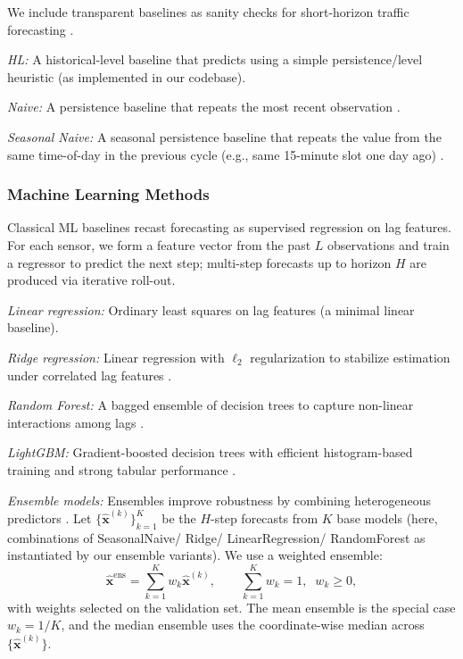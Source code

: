\documentclass[10pt]{article}
\begin{document}
We include transparent baselines as sanity checks for short-horizon traffic forecasting \cite{hyndman2021fpp}.

\textit{HL:}
A historical-level baseline that predicts using a simple persistence/level heuristic (as implemented in our codebase).

\textit{Naive:}
A persistence baseline that repeats the most recent observation \cite{hyndman2021fpp}.

\textit{Seasonal Naive:}
A seasonal persistence baseline that repeats the value from the same time-of-day in the previous cycle
(e.g., same 15-minute slot one day ago) \cite{hyndman2021fpp}.

\subsubsection{Machine Learning Methods}
Classical ML baselines recast forecasting as supervised regression on lag features. For each sensor,
we form a feature vector from the past $L$ observations and train a regressor to predict the next step;
multi-step forecasts up to horizon $H$ are produced via iterative roll-out.

\textit{Linear regression:}
Ordinary least squares on lag features (a minimal linear baseline).

\textit{Ridge regression:}
Linear regression with $\ell_2$ regularization to stabilize estimation under correlated lag features \cite{hoerl1970ridge}.

\textit{Random Forest:}
A bagged ensemble of decision trees to capture non-linear interactions among lags \cite{breiman2001randomforest}.

\textit{LightGBM:}
Gradient-boosted decision trees with efficient histogram-based training and strong tabular performance \cite{ke2017lightgbm}.

\textit{Ensemble models:}
Ensembles improve robustness by combining heterogeneous predictors \cite{bates1969combination}.
Let $\{\hat{\mathbf{x}}^{(k)}\}_{k=1}^K$ be the $H$-step forecasts from $K$ base models (here, combinations of
SeasonalNaive/ Ridge/ LinearRegression/ RandomForest as instantiated by our ensemble variants). We use a weighted ensemble:
\begin{equation}
\hat{\mathbf{x}}^{\text{ens}}=\sum_{k=1}^K w_k \hat{\mathbf{x}}^{(k)}, \qquad
\sum_{k=1}^K w_k=1,\;\; w_k\ge 0,
\end{equation}
with weights selected on the validation set. The mean ensemble is the special case $w_k = 1/K$,
and the median ensemble uses the coordinate-wise median across $\{\hat{\mathbf{x}}^{(k)}\}$.
\end{document}
